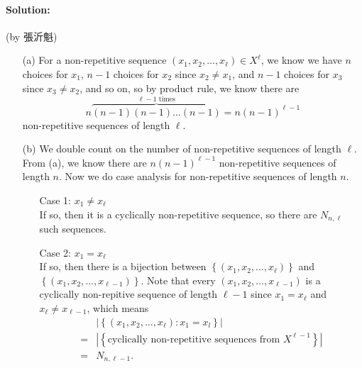\documentclass[a4paper,12pt]{article}
\begin{document}
\paragraph{Solution:} (by 張沂魁)
\begin{itemize}
	\item[(a)] For a non-repetitive sequence \((x_1, x_2, \dots , x_{\ell} ) \in X^{\ell} \), we know we have \(n\) choices for \(x_1\), \(n - 1\) choices for \(x_2\) since \(x_2 \neq x_1\), and \(n - 1\) choices for \(x_3\) since \(x_3 \neq x_2\), and so on, so by product rule, we know there are
	\[
		n\overbrace{(n-1)(n-1)\dots (n-1)}^{\ell -1 \text{ times}} = n (n-1)^{\ell -1}
	\] non-repetitive sequences of length \(\ell \). 
	\item[(b)] We double count on the number of non-repetitive sequences of length \(\ell \). From (a), we know there are \(n(n-1)^{\ell - 1}\) non-repetitive sequences of length \(n\). Now we do case analysis for non-repetitive sequences of length \(n\).
	\begin{itemize}
		\item[]Case 1: \(x_ 1 \neq x_{\ell } \) \\
		If so, then it is a cyclically non-repetitive sequence, so there are \(N_{n, \ell }\) such sequences.  
		\item[]Case 2: \(x_1 = x_{\ell } \) \\
		If so, then there is a bijection between \(\left\{ (x_1, x_2, \dots , x_{\ell } ) \right\} \) and \(\left\{ (x_1, x_2, \dots , x_{\ell -1}) \right\} \). Note that every \((x_1, x_2, \dots , x_{\ell - 1})\) is a cyclically non-repitive sequence of length \(\ell - 1\) since \(x_1 = x_{\ell}\) and \(x_{\ell } \neq x_{\ell  - 1} \), which means 
		\begin{align*}
			&\left\vert \left\{ (x_1, x_2, \dots , x_{\ell } ): x_1 = x_l \right\}  \right\vert \\
			=&\left\vert \left\{ \text{cyclically non-repetitive sequences from } X^{\ell - 1}\right\}  \right\vert \\
			= &N_{n, \ell  - 1}.
		\end{align*}
		

\end{itemize}
\end{itemize}
\end{document}
